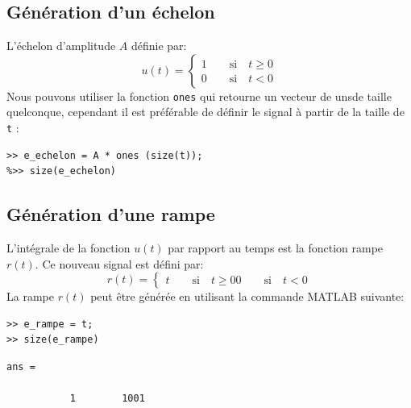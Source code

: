 \subsection{Génération d'un échelon}
L'échelon d'amplitude $A$ définie par:
\[
    u(t)=\begin{cases}
        1 \qquad \textrm{si} \quad t\geq 0 \\
        0 \qquad \textrm{si} \quad t<0
         \end{cases}
\]
Nous pouvons utiliser la fonction \texttt{ones} qui retourne un vecteur 
de \fg uns\og de taille quelconque, cependant il est préférable de définir 
le signal à partir de la taille de \texttt{t} :  
\begin{verbatim}
>> e_echelon = A * ones (size(t));
%>> size(e_echelon)
\end{verbatim}


\captionsetup{width=0.9\linewidth}
\subsection{Génération d'une rampe}
L'intégrale de la fonction $u(t)$ par rapport au temps est la fonction rampe 
$r(t)$. Ce nouveau signal est défini par:
\[
    r(t)=\begin{cases}
        t \qquad \textrm{si} \quad  t\geq 0
        0 \qquad \textrm{si} \quad  t<0
         \end{cases}
\]
La rampe $r(t)$ peut être générée en utilisant la commande MATLAB suivante:
\begin{verbatim}
>> e_rampe = t;
>> size(e_rampe)
\end{verbatim}
\begin{verbatim}
ans =

           1        1001
\end{verbatim}
